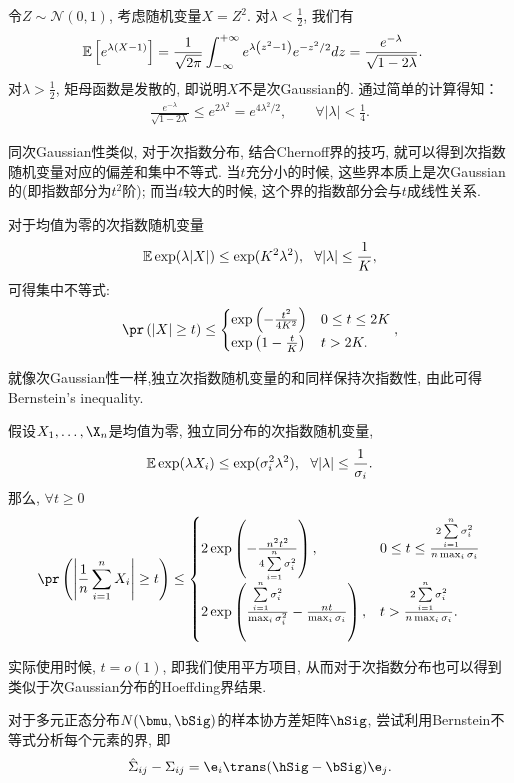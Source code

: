   \begin{exm}[非次Gaussian的次指数随机变量]
	令$Z \sim \mathcal{N}(0,1)$, 考虑随机变量$X=Z^{2}$. 对$\lambda<\frac{1}{2}$, 我们有
	\begin{align*}
	  \mathbb{E}\left[e^{\lambda(X-1)}\right] &=\frac{1}{\sqrt{2 \pi}} \int_{-\infty}^{+\infty} e^{\lambda\left(z^{2}-1\right)} e^{-z^{2} / 2} d z=\frac{e^{-\lambda}}{\sqrt{1-2 \lambda}}.
	\end{align*}
  对$\lambda>\frac{1}{2}$, 矩母函数是发散的, 即说明$X$不是次Gaussian的. 通过简单的计算得知：
	\begin{align}
	  \frac{e^{-\lambda}}{\sqrt{1-2 \lambda}} \leq e^{2 \lambda^{2}}=e^{4 \lambda^{2} / 2}, \qquad \forall|\lambda|<\frac{1}{4}.
	  \label{eq:2.14}
	\end{align}
  \end{exm}

    
  同次Gaussian性类似, 对于次指数分布, 结合Chernoff界的技巧, 就可以得到次指数随机变量对应的偏差和集中不等式. 当$t$充分小的时候, 这些界本质上是次Gaussian的(即指数部分为$t^2$阶); 而当$t$较大的时候, 这个界的指数部分会与$t$成线性关系. 	
	  \begin{prop}[次指数的Chernoff界]\label{prop:2.10}
	对于均值为零的次指数随机变量
	\begin{align*}
		\mathbb{E} \exp(\lambda |X|) \leq \exp(K^2 \lambda^2),~~\forall |\lambda| \leq \frac{1}{K},
	\end{align*}
	可得集中不等式:
	\begin{align*}
		\pr\left(|X|\geq t \right) \leq \begin{cases}
		\exp\left(-\frac{t^2}{4K^2}  \right) 	& 0\leq t \leq 2 K\\
			\exp\left(1-\frac{t}{K} \right)& t>2K.
		\end{cases}, 
	\end{align*}
\end{prop}
	  就像次Gaussian性一样,独立次指数随机变量的和同样保持次指数性, 由此可得Bernstein's inequality.
\begin{thm}[Bernstein不等式]
假设$X_1,\ldots,\X_n$是均值为零, 独立同分布的次指数随机变量,
\begin{align*}
	\mathbb{E} \exp(\lambda X_i) \leq \exp(\sigma_i^2 \lambda^2),~~\forall |\lambda| \leq \frac{1}{\sigma_i}.
\end{align*}
那么, $\forall t \geq 0$
\begin{align*}
	\pr \left(\left|\frac{1}{n}\sum_{i=1}^n X_i\right| \geq t  \right) \leq \begin{cases}
		2 \exp \left(-\frac{n^2t^2}{4 \sum\limits_{i=1}^n \sigma_i^2}  \right), & 0\leq t \leq \frac{2 \sum\limits_{i=1}^n \sigma_i^2}{n \max_i \sigma_i}\\
		2\exp\left(\frac{\sum_{i=1}^n \limits \sigma_i^2}{\max_i \sigma_i^2}-\frac{nt}{\max_{i} \sigma_i}  \right),& t >\frac{2 \sum\limits_{i=1}^n \sigma_i^2}{n \max_i \sigma_i}.
	\end{cases}
\end{align*}
\end{thm}
实际使用时候, $t=o(1)$, 即我们使用平方项目, 从而对于次指数分布也可以得到类似于次Gaussian分布的Hoeffding界结果. 



\begin{ques}
对于多元正态分布$N(\bmu,\bSig)$的样本协方差矩阵$\hSig$, 尝试利用Bernstein不等式分析每个元素的界, 即
\begin{align*}
	\hat{\Sigma}_{ij}-\Sigma_{ij}=\e_i \trans (\hSig-\bSig) \e_j.
\end{align*}
\end{ques}